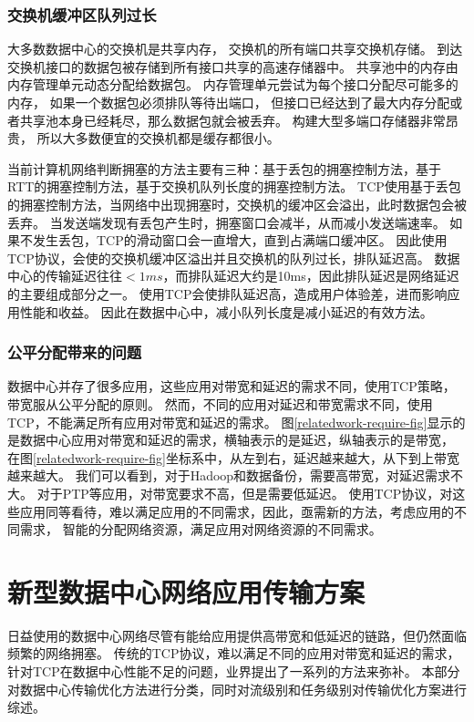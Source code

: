 \subsubsection{交换机缓冲区队列过长}

大多数数据中心的交换机是共享内存，
交换机的所有端口共享交换机存储。
到达交换机接口的数据包被存储到所有接口共享的高速存储器中。
共享池中的内存由内存管理单元动态分配给数据包。
内存管理单元尝试为每个接口分配尽可能多的内存，
如果一个数据包必须排队等待出端口，
但接口已经达到了最大内存分配或者共享池本身已经耗尽，那么数据包就会被丢弃。
构建大型多端口存储器非常昂贵，
所以大多数便宜的交换机都是缓存都很小。

当前计算机网络判断拥塞的方法主要有三种：基于丢包的拥塞控制方法，基于RTT的拥塞控制方法，基于交换机队列长度的拥塞控制方法。
TCP使用基于丢包的拥塞控制方法，当网络中出现拥塞时，交换机的缓冲区会溢出，此时数据包会被丢弃。
当发送端发现有丢包产生时，拥塞窗口会减半，从而减小发送端速率。
如果不发生丢包，TCP的滑动窗口会一直增大，直到占满端口缓冲区。
因此使用TCP协议，会使的交换机缓冲区溢出并且交换机的队列过长，排队延迟高。
数据中心的传输延迟往往$<1ms$，而排队延迟大约是10ms\cite{DCTCP}，因此排队延迟是网络延迟的主要组成部分之一。
使用TCP会使排队延迟高，造成用户体验差，进而影响应用性能和收益。
因此在数据中心中，减小队列长度是减小延迟的有效方法。

\subsubsection{公平分配带来的问题}

数据中心并存了很多应用，这些应用对带宽和延迟的需求不同，使用TCP策略，带宽服从公平分配的原则。
然而，不同的应用对延迟和带宽需求不同，使用TCP，不能满足所有应用对带宽和延迟的需求。
图\ref{relatedwork-require-fig}显示的是数据中心应用对带宽和延迟的需求，横轴表示的是延迟，纵轴表示的是带宽，
在图\ref{relatedwork-require-fig}坐标系中，从左到右，延迟越来越大，从下到上带宽越来越大。
我们可以看到，对于Hadoop和数据备份，需要高带宽，对延迟需求不大。
对于PTP等应用，对带宽要求不高，但是需要低延迟。
使用TCP协议，对这些应用同等看待，难以满足应用的不同需求，因此，亟需新的方法，考虑应用的不同需求，
智能的分配网络资源，满足应用对网络资源的不同需求。


\section{新型数据中心网络应用传输方案}
日益使用的数据中心网络尽管有能给应用提供高带宽和低延迟的链路，但仍然面临频繁的网络拥塞\cite{Incast08, Incast09}。
传统的TCP协议，难以满足不同的应用对带宽和延迟的需求，针对TCP在数据中心性能不足的问题，业界提出了一系列的方法来弥补。
本部分对数据中心传输优化方法进行分类，同时对流级别和任务级别对传输优化方案进行综述。
